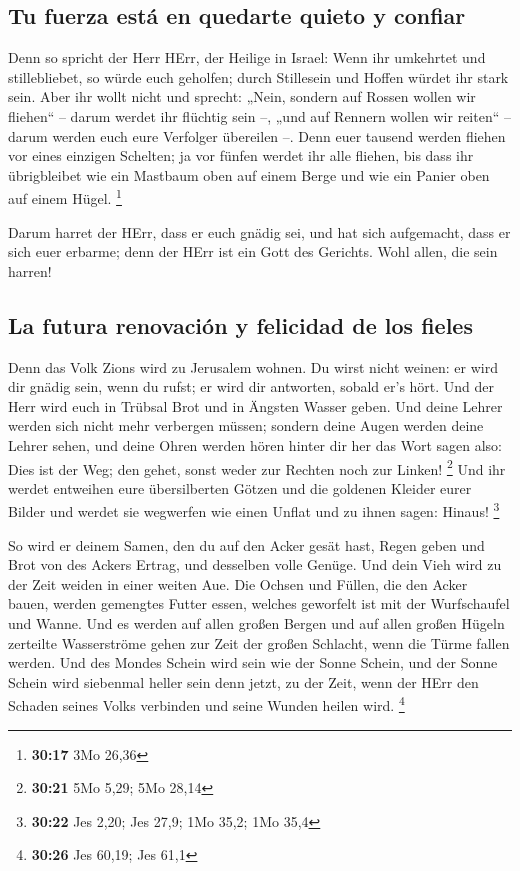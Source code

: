 \hypertarget{tu-fuerza-estuxe1-en-quedarte-quieto-y-confiar}{%
\subsection{Tu fuerza está en quedarte quieto y
confiar}\label{tu-fuerza-estuxe1-en-quedarte-quieto-y-confiar}}

 Denn so spricht der Herr HErr, der Heilige in Israel:
Wenn ihr umkehrtet und stillebliebet, so würde euch geholfen; durch
Stillesein und Hoffen würdet ihr stark sein. Aber ihr wollt nicht
 und sprecht: „Nein, sondern auf Rossen wollen wir
fliehen`` -- darum werdet ihr flüchtig sein --, „und auf Rennern wollen
wir reiten`` -- darum werden euch eure Verfolger übereilen --.
 Denn euer tausend werden fliehen vor eines einzigen
Schelten; ja vor fünfen werdet ihr alle fliehen, bis dass ihr
übrigbleibet wie ein Mastbaum oben auf einem Berge und wie ein Panier
oben auf einem Hügel. \footnote{\textbf{30:17} 3Mo 26,36}

 Darum harret der HErr, dass er euch gnädig sei, und hat
sich aufgemacht, dass er sich euer erbarme; denn der HErr ist ein Gott
des Gerichts. Wohl allen, die sein harren!

\hypertarget{la-futura-renovaciuxf3n-y-felicidad-de-los-fieles}{%
\subsection{La futura renovación y felicidad de los
fieles}\label{la-futura-renovaciuxf3n-y-felicidad-de-los-fieles}}

 Denn das Volk Zions wird zu Jerusalem wohnen. Du wirst
nicht weinen: er wird dir gnädig sein, wenn du rufst; er wird dir
antworten, sobald er's hört.  Und der Herr wird euch in
Trübsal Brot und in Ängsten Wasser geben. Und deine Lehrer werden sich
nicht mehr verbergen müssen; sondern deine Augen werden deine Lehrer
sehen,  und deine Ohren werden hören hinter dir her das
Wort sagen also: Dies ist der Weg; den gehet, sonst weder zur Rechten
noch zur Linken! \footnote{\textbf{30:21} 5Mo 5,29; 5Mo 28,14}
 Und ihr werdet entweihen eure übersilberten Götzen und
die goldenen Kleider eurer Bilder und werdet sie wegwerfen wie einen
Unflat und zu ihnen sagen: Hinaus! \footnote{\textbf{30:22} Jes 2,20;
  Jes 27,9; 1Mo 35,2; 1Mo 35,4}

 So wird er deinem Samen, den du auf den Acker gesät
hast, Regen geben und Brot von des Ackers Ertrag, und desselben volle
Genüge. Und dein Vieh wird zu der Zeit weiden in einer weiten Aue.
 Die Ochsen und Füllen, die den Acker bauen, werden
gemengtes Futter essen, welches geworfelt ist mit der Wurfschaufel und
Wanne.  Und es werden auf allen großen Bergen und auf
allen großen Hügeln zerteilte Wasserströme gehen zur Zeit der großen
Schlacht, wenn die Türme fallen werden.  Und des Mondes
Schein wird sein wie der Sonne Schein, und der Sonne Schein wird
siebenmal heller sein denn jetzt, zu der Zeit, wenn der HErr den Schaden
seines Volks verbinden und seine Wunden heilen wird. \footnote{\textbf{30:26}
  Jes 60,19; Jes 61,1}

